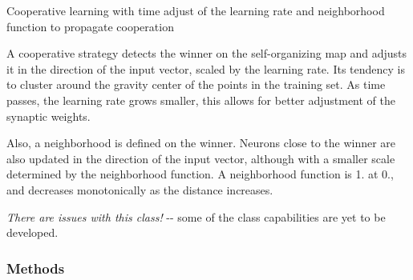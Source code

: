 Cooperative learning with time adjust of the learning rate and neighborhood
function to propagate cooperation

A cooperative strategy detects the winner on the self-organizing map and
adjusts it in the direction of the input vector, scaled by the learning
rate. Its tendency is to cluster around the gravity center of the points in
the training set. As time passes, the learning rate grows smaller, this
allows for better adjustment of the synaptic weights.

Also, a neighborhood is defined on the winner. Neurons close to the winner
are also updated in the direction of the input vector, although with a
smaller scale determined by the neighborhood function. A neighborhood
function is 1. at 0., and decreases monotonically as the distance increases.

\emph{There are issues with this class!} -{}- some of the class capabilities are
yet to be developed.


  \subsubsection{Methods}

    \vspace{0.5ex}

